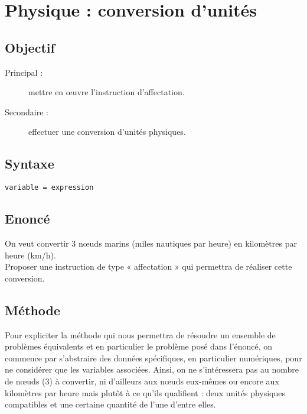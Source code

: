 \section{Physique : conversion d'unités}\label{affectation:physique}
\subsection{Objectif}\label{affectation:physique:objectif}
\begin{description}
\item[Principal : ] mettre en \oe uvre l'instruction d'affectation.
\item[Secondaire :] effectuer une conversion d'unités physiques.
\end{description}

\subsection{Syntaxe \python}\label{affectation:physique:python} 
\begin{description}
\item[\texttt{variable = expression}]\mbox{}
\end{description}

\subsection{Enoncé}\label{affectation:physique:enonce}
On veut convertir 3 n\oe uds marins (miles nautiques par heure) en kilomètres par heure (km/h).\\
Proposer une instruction de type « affectation » qui permettra de réaliser cette conversion.

\subsection{Méthode}\label{affectation:physique:methode}
Pour expliciter la méthode qui nous permettra de résoudre un ensemble de problèmes 
équivalents et en particulier le problème posé dans l'énoncé, on commence par s'abstraire 
des données spécifiques, en particulier numériques, pour ne considérer que les variables associées. 
Ainsi, on ne s'intéressera pas au nombre de n\oe uds (3) à convertir, ni d'ailleurs aux n\oe uds
eux-mêmes ou encore aux kilomètres par heure mais plutôt à ce qu'ils qualifient : deux unités 
physiques compatibles et une certaine quantité de l'une d'entre elles.

